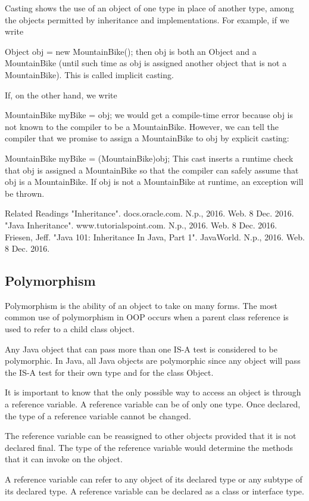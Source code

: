 Casting shows the use of an object of one type in place of another type, among the objects permitted by inheritance and implementations. For example, if we write

Object obj = new MountainBike();
then obj is both an Object and a MountainBike (until such time as obj is assigned another object that is not a MountainBike). This is called implicit casting.

If, on the other hand, we write

MountainBike myBike = obj;
we would get a compile-time error because obj is not known to the compiler to be a MountainBike. However, we can tell the compiler that we promise to assign a MountainBike to obj by explicit casting:

MountainBike myBike = (MountainBike)obj;
This cast inserts a runtime check that obj is assigned a MountainBike so that the compiler can safely assume that obj is a MountainBike. If obj is not a MountainBike at runtime, an exception will be thrown.

Related Readings
"Inheritance". docs.oracle.com. N.p., 2016. Web. 8 Dec. 2016.
"Java Inheritance". www.tutorialspoint.com. N.p., 2016. Web. 8 Dec. 2016.
Friesen, Jeff. "Java 101: Inheritance In Java, Part 1". JavaWorld. N.p., 2016. Web. 8 Dec. 2016.

\subsection{Polymorphism}

Polymorphism is the ability of an object to take on many forms. The most common use of polymorphism in OOP occurs when a parent class reference is used to refer to a child class object.

Any Java object that can pass more than one IS-A test is considered to be polymorphic. In Java, all Java objects are polymorphic since any object will pass the IS-A test for their own type and for the class Object.

It is important to know that the only possible way to access an object is through a reference variable. A reference variable can be of only one type. Once declared, the type of a reference variable cannot be changed.

The reference variable can be reassigned to other objects provided that it is not declared final. The type of the reference variable would determine the methods that it can invoke on the object.

A reference variable can refer to any object of its declared type or any subtype of its declared type. A reference variable can be declared as a class or interface type.

